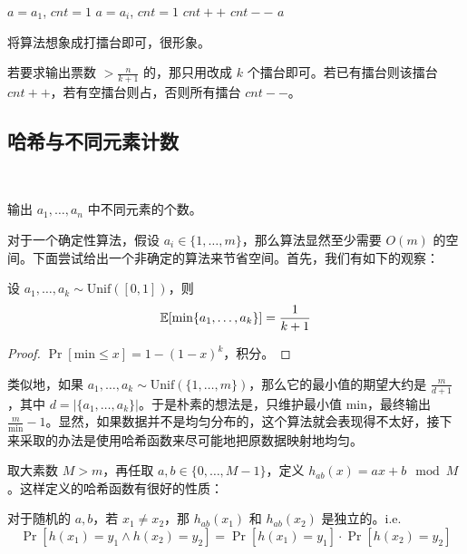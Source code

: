 \begin{algorithm}[h]
    \caption{Majority Vote}
    \begin{algorithmic}[1]
        \State $a = a_{1}$, $cnt = 1$
                \State $a = a_{i}$, $cnt = 1$
            \Else
                    \State $cnt ++$
                \Else
                    \State $cnt --$
                \EndIf
            \EndIf
        \EndFor
        \State \Return $a$
    \end{algorithmic}
\end{algorithm}

将算法想象成打擂台即可，很形象。

\begin{corollary}
    若要求输出票数 $> \frac{n}{k+1}$ 的，那只用改成 $k$ 个擂台即可。若已有擂台则该擂台 $cnt++$，若有空擂台则占，否则所有擂台 $cnt--$。
\end{corollary}

\subsection{哈希与不同元素计数} ~

输出 $a_1, \dots, a_n$ 中不同元素的个数。

对于一个确定性算法，假设 $a_i \in \{1, \dots, m\}$，那么算法显然至少需要 $O(m)$ 的空间。下面尝试给出一个非确定的算法来节省空间。首先，我们有如下的观察：

\begin{lemma}
    设 $a_1, \dots, a_k \sim \text{Unif}([0, 1])$，则
    \[
        \mathbb{E}[\min\{a_{1}, \dots, a_{k}\}]=\frac{1}{k+1}
    \]
\end{lemma}

\begin{proof}
    $\Pr[\mathrm{min} \le x] = 1 - (1 - x)^k$，积分。
\end{proof}

类似地，如果 $a_1, \dots, a_k \sim \text{Unif}(\{1, \dots, m\})$，那么它的最小值的期望大约是 $\frac{m}{d+1}$，其中 $d = |\{a_1, \dots, a_k\}|$。于是朴素的想法是，只维护最小值 $\mathrm{min}$，最终输出 $\frac{m}{\mathrm{min}} - 1$。显然，如果数据并不是均匀分布的，这个算法就会表现得不太好，接下来采取的办法是使用哈希函数来尽可能地把原数据映射地均匀。

取大素数 $M > m$，再任取 $a, b \in \{0, \dots, M - 1\}$，定义 $h_{ab}(x) = ax + b \mod M$。这样定义的哈希函数有很好的性质：

\begin{lemma}
    对于随机的 $a, b$，若 $x_{1}\ne x_{2}$，那 $h_{ab}(x_1)$ 和 $h_{ab}(x_2)$ 是独立的。i.e.
    \[
        \Pr[h(x_1)=y_1 \land h(x_2)=y_2] = \Pr[h(x_1)=y_1] \cdot \Pr[h(x_2)=y_2]
    \]
\end{lemma}

